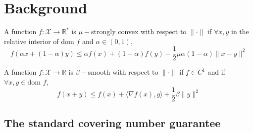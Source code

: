 \section{Background}
\label{sec:app:background}





\begin{definition}
    A function $f: \mathcal{X} \to \mathbb{R}^*$ is $\mu-$strongly convex with respect to $\lVert \cdot \rVert$ if $\forall x, y$ in the relative interior of $\text{dom } f$ and $\alpha \in (0, 1)$,
    $$
    f(\alpha x + (1 - \alpha) y) \leq \alpha f(x) + (1 - \alpha) f(y) - \frac{1}{2} \mu \alpha (1 - \alpha) \lVert x - y \rVert^2
    $$
\end{definition}

\begin{definition}[Smoothness]
    A function $f: \mathcal{X} \to \mathbb{R}$ is $\beta-$smooth with respect to $\lVert \cdot \rVert$ if $f \in C^1$ and if $\forall x, y \in \text{dom } f$,
    $$
    f(x + y) \leq f(x) + \langle \nabla f(x), y \rangle + \frac{1}{2} \beta \lVert y \rVert^2
    $$
\end{definition}

\subsection{The standard covering number guarantee}
\label{sec:covering}


